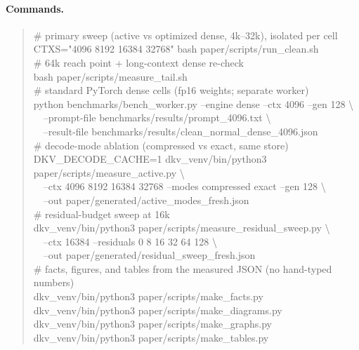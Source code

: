 \paragraph{Commands.}
\begin{quote}\small\ttfamily
\# primary sweep (active vs optimized dense, 4k--32k), isolated per cell\\
CTXS="4096 8192 16384 32768" bash paper/scripts/run\_clean.sh\\[3pt]
\# 64k reach point + long-context dense re-check\\
bash paper/scripts/measure\_tail.sh\\[3pt]
\# standard PyTorch dense cells (fp16 weights; separate worker)\\
python benchmarks/bench\_worker.py --engine dense --ctx 4096 --gen 128 \textbackslash\\
\ \ --prompt-file benchmarks/results/prompt\_4096.txt \textbackslash\\
\ \ --result-file benchmarks/results/clean\_normal\_dense\_4096.json\\[3pt]
\# decode-mode ablation (compressed vs exact, same store)\\
DKV\_DECODE\_CACHE=1 dkv\_venv/bin/python3 paper/scripts/measure\_active.py \textbackslash\\
\ \ --ctx 4096 8192 16384 32768 --modes compressed exact --gen 128 \textbackslash\\
\ \ --out paper/generated/active\_modes\_fresh.json\\[3pt]
\# residual-budget sweep at 16k\\
dkv\_venv/bin/python3 paper/scripts/measure\_residual\_sweep.py \textbackslash\\
\ \ --ctx 16384 --residuals 0 8 16 32 64 128 \textbackslash\\
\ \ --out paper/generated/residual\_sweep\_fresh.json\\[3pt]
\# facts, figures, and tables from the measured JSON (no hand-typed numbers)\\
dkv\_venv/bin/python3 paper/scripts/make\_facts.py\\
dkv\_venv/bin/python3 paper/scripts/make\_diagrams.py\\
dkv\_venv/bin/python3 paper/scripts/make\_graphs.py\\
dkv\_venv/bin/python3 paper/scripts/make\_tables.py
\end{quote}

